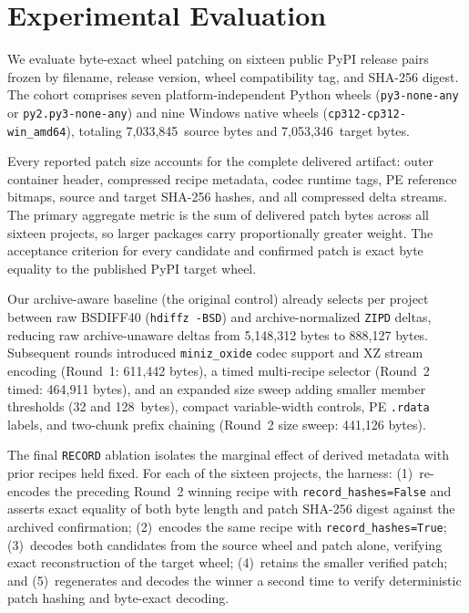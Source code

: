 \documentclass[10pt,letterpaper]{article}
\theoremstyle{remark}
\begin{document}
\section{Experimental Evaluation}
\label{sec:eval}

We evaluate byte-exact wheel patching on sixteen public PyPI release pairs frozen by filename, release version, wheel compatibility tag, and SHA-256 digest. The cohort comprises seven platform-independent Python wheels (\texttt{py3-none-any} or \texttt{py2.py3-none-any}) and nine Windows native wheels (\texttt{cp312-cp312-win\_amd64}), totaling 7,033,845~source bytes and 7,053,346~target bytes.

Every reported patch size accounts for the complete delivered artifact: outer container header, compressed recipe metadata, codec runtime tags, PE reference bitmaps, source and target SHA-256 hashes, and all compressed delta streams. The primary aggregate metric is the sum of delivered patch bytes across all sixteen projects, so larger packages carry proportionally greater weight. The acceptance criterion for every candidate and confirmed patch is exact byte equality to the published PyPI target wheel.

Our archive-aware baseline (the original control) already selects per project between raw BSDIFF40 (\texttt{hdiffz -BSD}) and archive-normalized \texttt{ZIPD} deltas, reducing raw archive-unaware deltas from 5,148,312 bytes to 888,127 bytes. Subsequent rounds introduced \texttt{miniz\_oxide} codec support and XZ stream encoding (Round~1: 611,442 bytes), a timed multi-recipe selector (Round~2 timed: 464,911 bytes), and an expanded size sweep adding smaller member thresholds (32 and 128~bytes), compact variable-width controls, PE \texttt{.rdata} labels, and two-chunk prefix chaining (Round~2 size sweep: 441,126 bytes).

The final \texttt{RECORD} ablation isolates the marginal effect of derived metadata with prior recipes held fixed. For each of the sixteen projects, the harness: (1)~re-encodes the preceding Round~2 winning recipe with \texttt{record\_hashes=False} and asserts exact equality of both byte length and patch SHA-256 digest against the archived confirmation; (2)~encodes the same recipe with \texttt{record\_hashes=True}; (3)~decodes both candidates from the source wheel and patch alone, verifying exact reconstruction of the target wheel; (4)~retains the smaller verified patch; and (5)~regenerates and decodes the winner a second time to verify deterministic patch hashing and byte-exact decoding.
\end{document}
